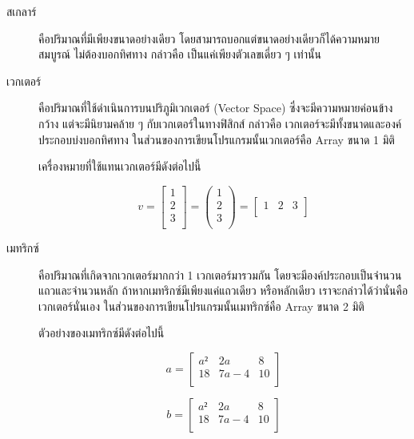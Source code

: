 \begin{description}
    \item[สเกลาร์] คือปริมาณที่มีเพียงขนาดอย่างเดียว โดยสามารถบอกแต่ขนาดอย่างเดียวก็ได้ความหมายสมบูรณ์ ไม่ต้องบอกทิศทาง 
    กล่าวคือ เป็นแค่เพียงตัวเลขเดี่ยว ๆ เท่านั้น
    
    \item[เวกเตอร์] คือปริมาณที่ใช้ดำเนินการบนปริภูมิเวกเตอร์ (Vector Space) ซึ่งจะมีความหมายค่อนข้างกว้าง แต่จะมีนิยามคล้าย ๆ กับเวกเตอร์ในทางฟิสิกส์
    กล่าวคือ เวกเตอร์จะมีทั้งขนาดและองค์ประกอบบ่งบอกทิศทาง ในส่วนของการเขียนโปรแกรมนั้นเวกเตอร์คือ Array ขนาด 1 มิติ

    เครื่องหมายที่ใช้แทนเวกเตอร์มีดังต่อไปนี้

    \begin{equation}
        v = \begin{bmatrix}
        1 \\
        2 \\
        3 \\
        \end{bmatrix}
        =
        \begin{pmatrix}
        1 \\
        2 \\
        3 \\
        \end{pmatrix}
        =
        \begin{bmatrix}
        1 & 2 & 3\\
        \end{bmatrix}
    \end{equation}

    \item[เมทริกซ์] คือปริมาณที่เกิดจากเวกเตอร์มากกว่า 1 เวกเตอร์มารวมกัน โดยจะมีองค์ประกอบเป็นจำนวนแถวและจำนวนหลัก 
    ถ้าหากเมทริกซ์มีเพียงแค่แถวเดียว หรือหลักเดียว เราจะกล่าวได้ว่านั่นคือเวกเตอร์นั่นเอง ในส่วนของการเขียนโปรแกรมนั้นเมทริกซ์คือ Array ขนาด 2 มิติ

    ตัวอย่างของเมทริกซ์มีดังต่อไปนี้

    \begin{equation}
        a = \begin{bmatrix}
        a² & 2a & 8\\
        18 & 7a-4 & 10\\
        \end{bmatrix}
    \end{equation}

    \begin{equation}
        b = \begin{bmatrix}
        a² & 2a & 8\\
        18 & 7a-4 & 10\\
        \end{bmatrix}
    \end{equation}

\end{description}

